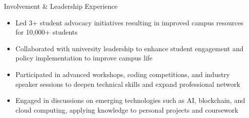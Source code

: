 \documentclass{resume}
\begin{document}
\begin{experienceSection}{Involvement \& Leadership Experience}
    \projectItem[
        title={Student Senate Committee for Student Affairs},
    ]
    \begin{itemize}[topsep=0pt, itemsep=-6pt, leftmargin=1.2em, rightmargin=0.8em, before=\raggedright, after=\normalfont]
        \vspace{-0.5em}
        \item Led 3+ student advocacy initiatives resulting in improved campus resources for 10,000+ students
        \item Collaborated with university leadership to enhance student engagement and policy implementation to improve campus life
    \end{itemize}
    \vspace{-0.5em}
    \projectItem[
        title={Association for Computing Machinery},
    ]
    \begin{itemize}[topsep=0pt, itemsep=-6pt, leftmargin=1.2em, rightmargin=0.8em, before=\raggedright, after=\normalfont]
        \vspace{-0.5em}
        \item Participated in advanced workshops, coding competitions, and industry speaker sessions to deepen technical skills and expand professional network
        \item Engaged in discussions on emerging technologies such as AI, blockchain, and cloud computing, applying knowledge to personal projects and coursework
    \end{itemize}
\end{experienceSection}
\end{document}
